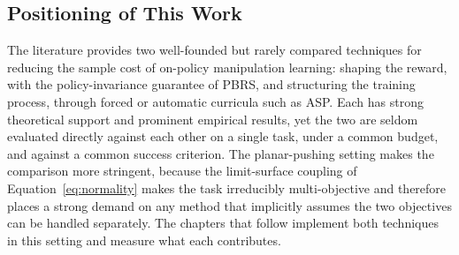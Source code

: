 \subsection{Positioning of This Work}

The literature provides two well-founded but rarely compared techniques for
reducing the sample cost of on-policy manipulation learning: shaping the reward,
with the policy-invariance guarantee of PBRS, and structuring the training
process, through forced or automatic curricula such as ASP. Each has strong
theoretical support and prominent empirical results, yet the two are seldom
evaluated directly against each other on a single task, under a common budget,
and against a common success criterion. The planar-pushing setting makes the
comparison more stringent, because the limit-surface coupling of
Equation~\ref{eq:normality} makes the task irreducibly multi-objective and
therefore places a strong demand on any method that implicitly assumes the two
objectives can be handled separately. The chapters that follow implement both
techniques in this setting and measure what each contributes.
